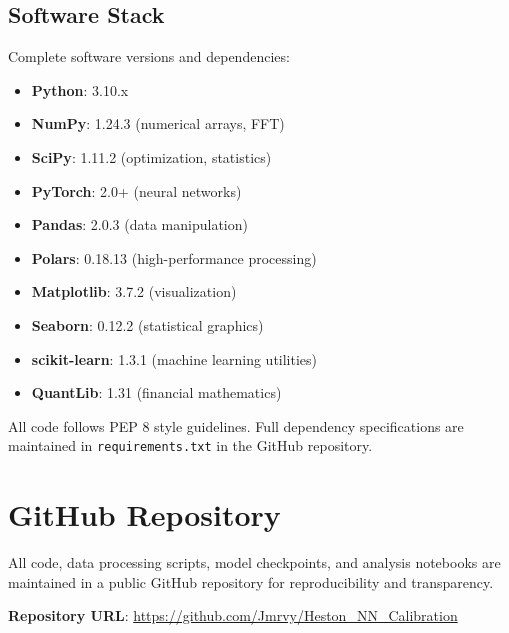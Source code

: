 \documentclass[12pt,a4paper]{article}
\begin{document}
\begin{appendices}
\subsection*{Software Stack}

Complete software versions and dependencies:

\begin{itemize}

\item \textbf{Python}: 3.10.x

\item \textbf{NumPy}: 1.24.3 (numerical arrays, FFT)

\item \textbf{SciPy}: 1.11.2 (optimization, statistics)

\item \textbf{PyTorch}: 2.0+ (neural networks)

\item \textbf{Pandas}: 2.0.3 (data manipulation)

\item \textbf{Polars}: 0.18.13 (high-performance processing)

\item \textbf{Matplotlib}: 3.7.2 (visualization)

\item \textbf{Seaborn}: 0.12.2 (statistical graphics)

\item \textbf{scikit-learn}: 1.3.1 (machine learning utilities)

\item \textbf{QuantLib}: 1.31 (financial mathematics)

\end{itemize}

All code follows PEP 8 style guidelines. Full dependency specifications are maintained in \texttt{requirements.txt} in the GitHub repository.

\section{GitHub Repository}

\label{app:code_repo}

All code, data processing scripts, model checkpoints, and analysis notebooks are maintained in a public GitHub repository for reproducibility and transparency.

\textbf{Repository URL}: \url{https://github.com/Jmrvy/Heston_NN_Calibration}

\end{appendices}



\newpage






\end{document}
